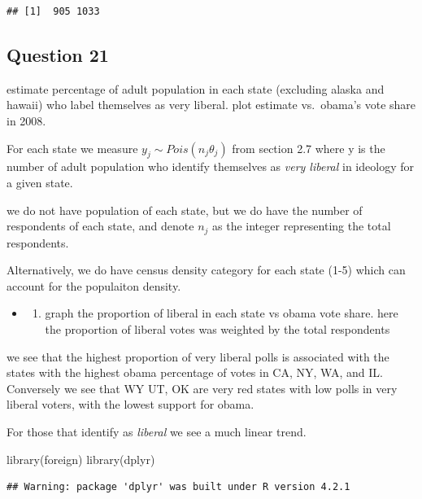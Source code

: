 \documentclass[
]{book}
\newenvironment{Shaded}{\begin{snugshade}}{\end{snugshade}}
\newcommand{\FunctionTok}[1]{\textcolor[rgb]{0.00,0.00,0.00}{#1}}
\newcommand{\NormalTok}[1]{#1}
\providecommand{\tightlist}{%
  \setlength{\itemsep}{0pt}\setlength{\parskip}{0pt}}
\theoremstyle{definition}
\theoremstyle{definition}
\theoremstyle{definition}
\theoremstyle{definition}
\theoremstyle{remark}
\begin{document}
\begin{verbatim}
## [1]  905 1033
\end{verbatim}

\hypertarget{question-21}{%
\subsection{Question 21}\label{question-21}}

estimate percentage of adult population in each state (excluding alaska and hawaii) who label themselves as very liberal. plot estimate vs.~obama's vote share in 2008.

For each state we measure \(y_j\sim Pois(n_j\theta_j)\) from section 2.7 where y is the number of adult population who identify themselves as \emph{very liberal} in ideology for a given state.

we do not have population of each state, but we do have the number of respondents of each state, and denote \(n_j\) as the integer representing the total respondents.

Alternatively, we do have census density category for each state (1-5) which can account for the populaiton density.

\begin{itemize}
\item
  \begin{enumerate}
  \def\labelenumi{(\alph{enumi})}
  \tightlist
  \item
    graph the proportion of liberal in each state vs obama vote share. here the proportion of liberal votes was weighted by the total respondents
  \end{enumerate}
\end{itemize}

we see that the highest proportion of very liberal polls is associated with the states with the highest obama percentage of votes in CA, NY, WA, and IL. Conversely we see that WY UT, OK are very red states with low polls in very liberal voters, with the lowest support for obama.

For those that identify as \emph{liberal} we see a much linear trend.

\begin{Shaded}
\begin{Highlighting}[]
 \FunctionTok{library}\NormalTok{(foreign)}
 \FunctionTok{library}\NormalTok{(dplyr)}
\end{Highlighting}
\end{Shaded}

\begin{verbatim}
## Warning: package 'dplyr' was built under R version 4.2.1
\end{verbatim}
\end{document}
